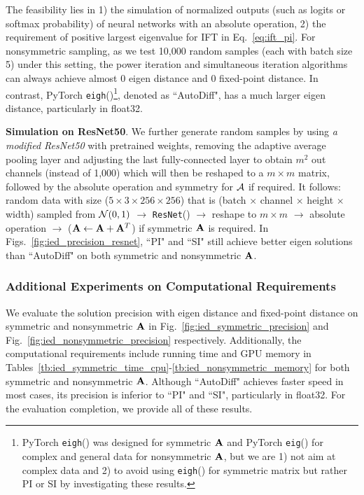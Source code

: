 The feasibility lies in 1) the simulation of normalized outputs (such as logits or softmax probability) of neural networks with an absolute operation,
2) the requirement of positive largest eigenvalue for IFT in Eq.~\eqref{eq:ift_pi}.
For nonsymmetric sampling, as we test 10,000 random samples (each with batch size 5) under this setting,
the power iteration and simultaneous iteration algorithms can always achieve almost 0 eigen distance and 0 fixed-point distance.
In contrast, PyTorch \texttt{eigh}()\footnote{PyTorch \texttt{eigh}() was designed for symmetric $\mathbf{A}$ and PyTorch \texttt{eig}() for complex and general data for nonsymmetric $\mathbf{A}$, but we are 1) not aim at complex data and 2) to avoid using \texttt{eigh}() for symmetric matrix but rather PI or SI by investigating these results.}, denoted as ``AutoDiff", has a much larger eigen distance, particularly in float32.

\textbf{Simulation on ResNet50}. We further generate random samples by using \textit{a modified ResNet50} with pretrained weights, removing the adaptive average pooling layer and adjusting the last fully-connected layer to obtain $m^2$ out channels (instead of 1,000) which will then be reshaped to a $m \times m$ matrix, followed by the absolute operation and symmetry for $\mathcal{A}$ if required.
It follows: random data with size ($5 \times 3 \times 256 \times 256$) that is (batch $\times$ channel $\times$ height $\times$ width) sampled from $\mathcal{N}(0, 1)$ $\rightarrow$ \texttt{ResNet}() $\rightarrow$ reshape to $m \times m$ $\rightarrow$ absolute operation $\rightarrow$ ($\mathbf{A} \leftarrow \mathbf{A} + \mathbf{A}^T$) if symmetric $\mathbf{A}$ is required.
In Figs.~\ref{fig:ied_precision_resnet}, ``PI" and ``SI" still achieve better eigen solutions than ``AutoDiff" on both symmetric and nonsymmetric $\mathbf{A}$.

\subsubsection{Additional Experiments on Computational Requirements}
We evaluate the solution precision with eigen distance and fixed-point distance on symmetric and nonsymmetric $\mathbf{A}$ in Fig.~\ref{fig:ied_symmetric_precision} and Fig.~\ref{fig:ied_nonsymmetric_precision} respectively.
Additionally, the computational requirements include running time and GPU memory in Tables~\ref{tb:ied_symmetric_time_cpu}-\ref{tb:ied_nonsymmetric_memory} for both symmetric and nonsymmetric $\mathbf{A}$.
Although ``AutoDiff" achieves faster speed in most cases, its precision is inferior to ``PI" and ``SI", particularly in float32.
For the evaluation completion, we provide all of these results.

